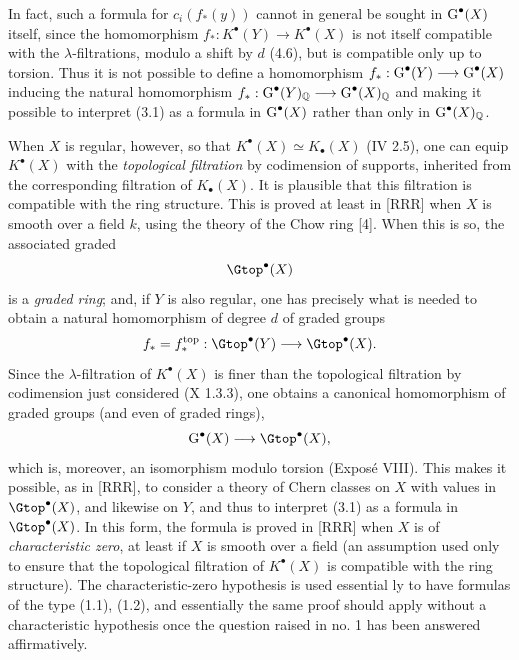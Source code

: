 In fact, such a formula for $c_i(f_*(y))$ cannot in general be sought in $\operatorname{G}^\bullet(X)$ itself, since the homomorphism $f_*:K^\bullet(Y)\longrightarrow K^\bullet(X)$ is not itself compatible with the $\lambda$-filtrations, modulo a shift by $d$ (4.6), but is compatible only up to torsion. Thus it is not possible to define a homomorphism $f_*:\operatorname{G}^\bullet(Y)\longrightarrow\operatorname{G}^\bullet(X)$ inducing the natural homomorphism $f_*:\operatorname{G}^\bullet(Y)_{\mathbb Q}\longrightarrow\operatorname{G}^\bullet(X)_{\mathbb Q}$ and making it possible to interpret (3.1) as a formula in $\operatorname{G}^\bullet(X)$ rather than only in $\operatorname{G}^\bullet(X)_{\mathbb Q}$.

When $X$ is regular, however, so that $K^\bullet(X)\simeq K_\bullet(X)$ (IV 2.5), one can equip $K^\bullet(X)$ with the \emph{topological filtration} by codimension of supports, inherited from the corresponding filtration of $K_\bullet(X)$. It is plausible that this filtration is compatible with the ring structure. This is proved at least in [RRR] when $X$ is smooth over a field $k$, using the theory of the Chow ring [4]. When this is so, the associated graded
\[
  \Gtop^\bullet(X)
\]
is a \emph{graded ring}; and, if $Y$ is also regular, one has precisely what is needed to obtain a natural homomorphism of degree $d$ of graded groups
\[
  f_*=f_*^{\mathrm{top}}:\Gtop^\bullet(Y)
  \longrightarrow\Gtop^\bullet(X).
\]
Since the $\lambda$-filtration of $K^\bullet(X)$ is finer than the topological filtration by codimension just considered (X 1.3.3), one obtains a canonical homomorphism of graded groups (and even of graded rings),
\[
  \Gr^\bullet(X)\longrightarrow\Gtop^\bullet(X),
\]
which is, moreover, an isomorphism modulo torsion (Expos\'e VIII). This makes it possible, as in [RRR], to consider a theory of Chern classes on $X$ with values in $\Gtop^\bullet(X)$, and likewise on $Y$, and thus to interpret (3.1) as a formula in $\Gtop^\bullet(X)$. In this form, the formula is proved in [RRR] when $X$ is of \emph{characteristic zero}, at least if $X$ is smooth over a field (an assumption used only to ensure that the topological filtration of $K^\bullet(X)$ is compatible with the ring structure). The characteristic-zero hypothesis is used essential%
ly to have formulas of the type (1.1), (1.2), and essentially the same proof should apply without a characteristic hypothesis once the question raised in no. 1 has been answered affirmatively.

